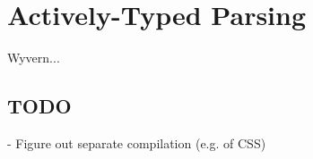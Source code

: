 \section{Actively-Typed Parsing}\label{aparsing}
Wyvern...

\subsection{TODO}
- Figure out separate compilation (e.g. of CSS)
